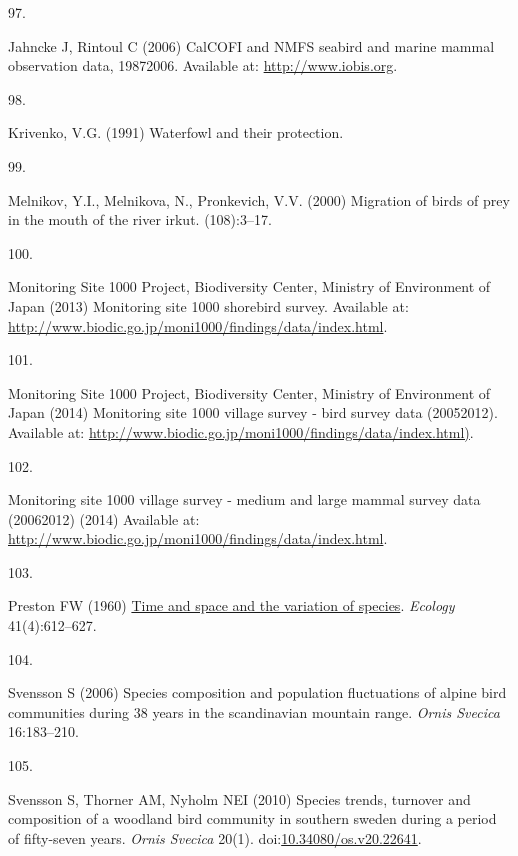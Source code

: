 \documentclass{article}
\newlength{\cslhangindent}
\newlength{\csllabelwidth}
\newlength{\cslentryspacingunit} %
\newenvironment{CSLReferences}[2] %
 {%
  \setlength{\parindent}{0pt}
  \ifodd #1
  \let\oldpar\par
  \def\par{\hangindent=\cslhangindent\oldpar}
  \fi
  \setlength{\parskip}{#2\cslentryspacingunit}
 }%
 {}
\newcommand{\CSLLeftMargin}[1]{\parbox[t]{\csllabelwidth}{#1}}
\newcommand{\CSLRightInline}[1]{\parbox[t]{\linewidth - \csllabelwidth}{#1}\break}
\begin{document}
\begin{CSLReferences}{0}{0}
\leavevmode{}%
\CSLLeftMargin{97. }%
\CSLRightInline{Jahncke J, Rintoul C (2006) CalCOFI and NMFS seabird and
marine mammal observation data, 1987{\textendash}2006. Available at:
\url{http://www.iobis.org}.}

\leavevmode{}%
\CSLLeftMargin{98. }%
\CSLRightInline{Krivenko, V.G. (1991) Waterfowl and their protection.}

\leavevmode{}%
\CSLLeftMargin{99. }%
\CSLRightInline{Melnikov, Y.I., Melnikova, N., Pronkevich, V.V. (2000)
Migration of birds of prey in the mouth of the river irkut.
(108):3--17.}

\leavevmode{}%
\CSLLeftMargin{100. }%
\CSLRightInline{Monitoring Site 1000 Project, Biodiversity Center,
Ministry of Environment of Japan (2013) Monitoring site 1000 shorebird
survey. Available at:
\url{http://www.biodic.go.jp/moni1000/findings/data/index.html}.}

\leavevmode{}%
\CSLLeftMargin{101. }%
\CSLRightInline{Monitoring Site 1000 Project, Biodiversity Center,
Ministry of Environment of Japan (2014) Monitoring site 1000 village
survey - bird survey data (2005{\textendash}2012). Available at:
\url{http://www.biodic.go.jp/moni1000/findings/data/index.html)}.}

\leavevmode{}%
\CSLLeftMargin{102. }%
\CSLRightInline{Monitoring site 1000 village survey - medium and large
mammal survey data (2006{\textendash}2012) (2014) Available at:
\url{http://www.biodic.go.jp/moni1000/findings/data/index.html}.}

\leavevmode{}%
\CSLLeftMargin{103. }%
\CSLRightInline{Preston FW (1960)
\href{https://doi.org/10.2307/1931793}{Time and space and the variation
of species}. \emph{Ecology} 41(4):612--627.}

\leavevmode{}%
\CSLLeftMargin{104. }%
\CSLRightInline{Svensson S (2006) Species composition and population
fluctuations of alpine bird communities during 38 years in the
scandinavian mountain range. \emph{Ornis Svecica} 16:183--210.}

\leavevmode{}%
\CSLLeftMargin{105. }%
\CSLRightInline{Svensson S, Thorner AM, Nyholm NEI (2010) Species
trends, turnover and composition of a woodland bird community in
southern sweden during a period of fifty-seven years. \emph{Ornis
Svecica} 20(1).
doi:\href{https://doi.org/10.34080/os.v20.22641}{10.34080/os.v20.22641}.}


\end{CSLReferences}
\end{document}
